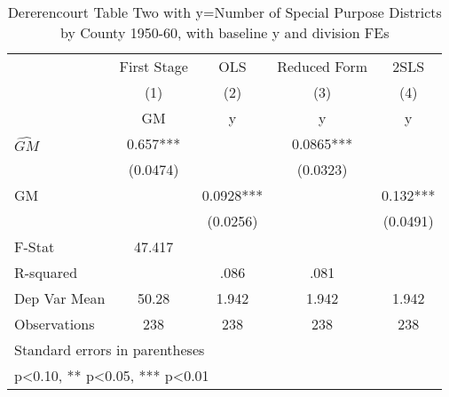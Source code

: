 \begin{table}[htbp]\centering
\def\sym#1{\ifmmode^{#1}\else\(^{#1}\)\fi}
\caption{Dererencourt Table Two with y=Number of Special Purpose Districts by County 1950-60, with baseline y and division FEs}
\begin{tabular}{l*{4}{c}}
\toprule
                    & First Stage   &         OLS   &Reduced Form   &        2SLS   \\
                    &\multicolumn{1}{c}{(1)}&\multicolumn{1}{c}{(2)}&\multicolumn{1}{c}{(3)}&\multicolumn{1}{c}{(4)}\\
                    &\multicolumn{1}{c}{GM}&\multicolumn{1}{c}{y}&\multicolumn{1}{c}{y}&\multicolumn{1}{c}{y}\\
\midrule
$\hat{GM}$          &       0.657***&               &      0.0865***&               \\
                    &    (0.0474)   &               &    (0.0323)   &               \\
\addlinespace
GM                  &               &      0.0928***&               &       0.132***\\
                    &               &    (0.0256)   &               &    (0.0491)   \\
\midrule
F-Stat              &      47.417   &               &               &               \\
R-squared           &               &        .086   &        .081   &               \\
Dep Var Mean        &       50.28   &       1.942   &       1.942   &       1.942   \\
Observations        &         238   &         238   &         238   &         238   \\
\bottomrule
\multicolumn{5}{l}{\footnotesize Standard errors in parentheses}\\
\multicolumn{5}{l}{\footnotesize * p<0.10, ** p<0.05, *** p<0.01}\\
\end{tabular}
\end{table}
